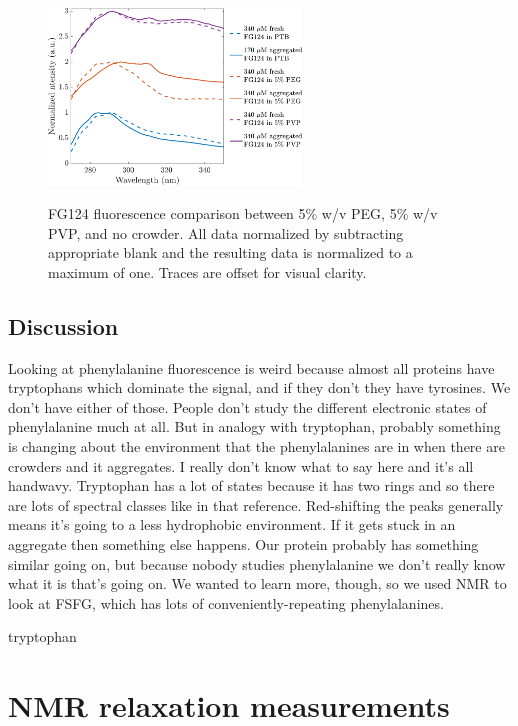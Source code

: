 \begin{figure}
\caption[FG124 fluorescence comparison between crowding agents.]{FG124 fluorescence comparison between 5\% w/v PEG, 5\% w/v PVP, and no crowder.  All data normalized by subtracting appropriate blank and the resulting data is normalized to a maximum of one.  Traces are offset for visual clarity.\\}
\centering
\includegraphics[width=0.6\textwidth]{figs/ch05/stacked-FG124-fluorimetry.pdf}
\label{fig:stacked-FG124-fluorimetry}
\end{figure}

\subsection{Discussion}

Looking at phenylalanine fluorescence is weird because almost all proteins have tryptophans which dominate the signal, and if they don't they have tyrosines.  We don't have either of those.  People don't study the different electronic states of phenylalanine much at all.  But in analogy with tryptophan, probably something is changing about the environment that the phenylalanines are in when there are crowders and it aggregates.  I really don't know what to say here and it's all handwavy.  Tryptophan has a lot of states because it has two rings and so there are lots of spectral classes like in that reference.  Red-shifting the peaks generally means it's going to a less hydrophobic environment.  If it gets stuck in an aggregate then something else happens.  Our protein probably has something similar going on, but because nobody studies phenylalanine we don't really know what it is that's going on.  We wanted to learn more, though, so we used NMR to look at FSFG, which has lots of conveniently-repeating phenylalanines.

\cite{ladokhin00,serrano-andres96} tryptophan


\section{NMR relaxation measurements}

